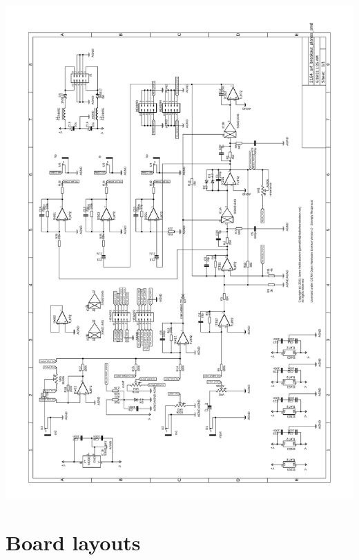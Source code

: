 \documentclass{article}
\begin{document}
\centering
\includegraphics[page=1, scale=0.6]{2164_svf_smd_schematic.pdf}

\section{Board layouts}
\end{document}
